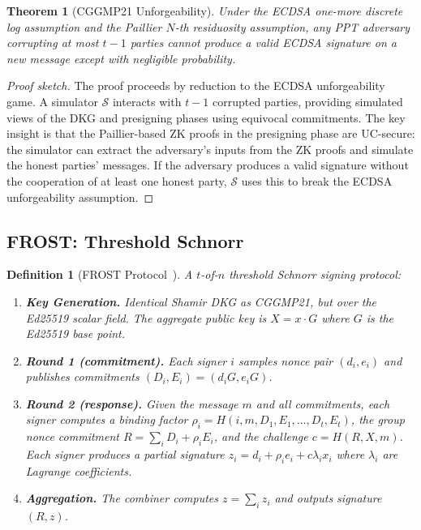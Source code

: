 \documentclass[11pt,a4paper]{article}
\newtheorem{theorem}{Theorem}[section]
\newtheorem{definition}{Definition}[section]
\begin{document}
\begin{theorem}[CGGMP21 Unforgeability]
\label{thm:cggmp-uf}
Under the ECDSA one-more discrete log assumption and the Paillier
$N$-th residuosity assumption, any PPT adversary corrupting at most
$t-1$ parties cannot produce a valid ECDSA signature on a new message
except with negligible probability.
\end{theorem}

\begin{proof}[Proof sketch]
The proof proceeds by reduction to the ECDSA unforgeability game.
A simulator $\mathcal{S}$ interacts with $t-1$ corrupted parties,
providing simulated views of the DKG and presigning phases using
equivocal commitments.  The key insight is that the Paillier-based
ZK proofs in the presigning phase are UC-secure: the simulator can
extract the adversary's inputs from the ZK proofs and simulate the
honest parties' messages.  If the adversary produces a valid signature
without the cooperation of at least one honest party, $\mathcal{S}$
uses this to break the ECDSA unforgeability assumption.
\end{proof}

\subsection{FROST: Threshold Schnorr}

\begin{definition}[FROST Protocol~\cite{frost}]
A $t$-of-$n$ threshold Schnorr signing protocol:
\begin{enumerate}[nosep]
  \item \textbf{Key Generation.}  Identical Shamir DKG as CGGMP21,
        but over the Ed25519 scalar field.  The aggregate public key
        is $X = x \cdot G$ where $G$ is the Ed25519 base point.
  \item \textbf{Round 1 (commitment).}  Each signer $i$ samples
        nonce pair $(d_i, e_i)$ and publishes commitments
        $(D_i, E_i) = (d_i G, e_i G)$.
  \item \textbf{Round 2 (response).}  Given the message $m$ and
        all commitments, each signer computes a binding factor
        $\rho_i = H(i, m, D_1, E_1, \ldots, D_t, E_t)$, the group
        nonce commitment $R = \sum_i D_i + \rho_i E_i$, and the
        challenge $c = H(R, X, m)$.  Each signer produces a partial
        signature $z_i = d_i + \rho_i e_i + c \lambda_i x_i$ where
        $\lambda_i$ are Lagrange coefficients.
  \item \textbf{Aggregation.}  The combiner computes
        $z = \sum_i z_i$ and outputs signature $(R, z)$.
\end{enumerate}
\end{definition}
\end{document}
